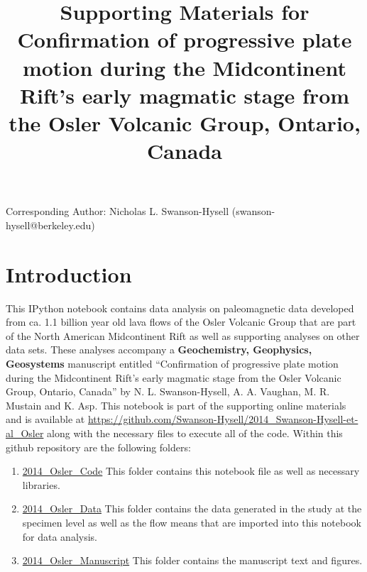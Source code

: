 \documentclass{article}
\title{Supporting Materials for Confirmation of progressive plate motion during the Midcontinent Rift’s early magmatic stage from the Osler Volcanic Group, Ontario, Canada}
\date{}
\begin{document}
    
    
    \maketitle
    \vspace{-.7 in}
    \noindent Corresponding Author: Nicholas L. Swanson-Hysell
(swanson-hysell@berkeley.edu)
    {\small \tableofcontents}
    

    





    \section{Introduction}


    This IPython notebook contains data analysis on paleomagnetic data
developed from ca. 1.1 billion year old lava flows of the Osler Volcanic
Group that are part of the North American Midcontinent Rift as well as
supporting analyses on other data sets. These analyses accompany a
\textbf{Geochemistry, Geophysics, Geosystems} manuscript entitled
``Confirmation of progressive plate motion during the Midcontinent
Rift's early magmatic stage from the Osler Volcanic Group, Ontario,
Canada'' by N. L. Swanson-Hysell, A. A. Vaughan, M. R. Mustain and K.
Asp. This notebook is part of the supporting online materials and is
available at
\url{https://github.com/Swanson-Hysell/2014_Swanson-Hysell-et-al_Osler}
along with the necessary files to execute all of the code. Within this
github repository are the following folders:

\begin{enumerate}
\def\labelenumi{\arabic{enumi}.}
\itemsep1pt\parskip0pt
\item
  \href{https://github.com/Swanson-Hysell/2014_Swanson-Hysell-et-al_Osler/tree/master/2014_Osler_Code}{2014\_Osler\_Code}
  This folder contains this notebook file as well as necessary
  libraries.
\item
  \href{https://github.com/Swanson-Hysell/2014_Swanson-Hysell-et-al_Osler/tree/master/2014_Osler_Data}{2014\_Osler\_Data}
  This folder contains the data generated in the study at the specimen
  level as well as the flow means that are imported into this notebook
  for data analysis.
\item
  \href{https://github.com/Swanson-Hysell/2014_Swanson-Hysell-et-al_Osler/tree/master/2014_Osler_Manuscript}{2014\_Osler\_Manuscript}
  This folder contains the manuscript text and figures.
\end{enumerate}
\end{document}

